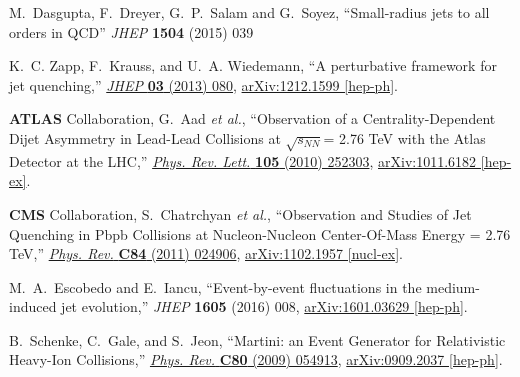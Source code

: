 \documentclass[a4paper,12pt]{article}
\numberwithin{equation}{section}
\begin{document}
\begin{thebibliography}{10}
  M.~Dasgupta, F.~Dreyer, G.~P.~Salam and G.~Soyez, ``Small-radius jets to all orders in QCD''
  {\it JHEP} {\bf 1504} (2015) 039



K.~C. Zapp, F.~Krauss, and U.~A. Wiedemann, ``{A perturbative framework for jet
  quenching},'' \href{http://dx.doi.org/10.1007/JHEP03(2013)080}{{\em JHEP}
  {\bfseries 03} (2013) 080},
\href{http://arxiv.org/abs/1212.1599}{{\ttfamily arXiv:1212.1599 [hep-ph]}}.



{\bfseries ATLAS} Collaboration, G.~Aad {\em et al.}, ``{Observation of a
  Centrality-Dependent Dijet Asymmetry in Lead-Lead Collisions at
  $\sqrt{s_{NN}}$= 2.76 TeV with the Atlas Detector at the LHC},''
  \href{http://dx.doi.org/10.1103/PhysRevLett.105.252303}{{\em Phys. Rev.
  Lett.} {\bfseries 105} (2010) 252303},
\href{http://arxiv.org/abs/1011.6182}{{\ttfamily arXiv:1011.6182 [hep-ex]}}.

{\bfseries CMS} Collaboration, S.~Chatrchyan {\em et al.}, ``{Observation and
  Studies of Jet Quenching in Pbpb Collisions at Nucleon-Nucleon Center-Of-Mass
  Energy = 2.76 TeV},''
  \href{http://dx.doi.org/10.1103/PhysRevC.84.024906}{{\em Phys. Rev.}
  {\bfseries C84} (2011) 024906},
\href{http://arxiv.org/abs/1102.1957}{{\ttfamily arXiv:1102.1957 [nucl-ex]}}.



  M.~A.~Escobedo and E.~Iancu,
  ``Event-by-event fluctuations in the medium-induced jet evolution,''
  {\em JHEP} {\bf 1605}  (2016) 008,
  \href{http://arxiv.org/abs/1601.03629}{{\ttfamily  arXiv:1601.03629 [hep-ph]}}.
  
B.~Schenke, C.~Gale, and S.~Jeon, ``{Martini: an Event Generator for
  Relativistic Heavy-Ion Collisions},''
  \href{http://dx.doi.org/10.1103/PhysRevC.80.054913}{{\em Phys. Rev.}
  {\bfseries C80} (2009) 054913},
\href{http://arxiv.org/abs/0909.2037}{{\ttfamily arXiv:0909.2037 [hep-ph]}}.

  

 
\end{thebibliography}



\newpage
\appendix
\end{document}
